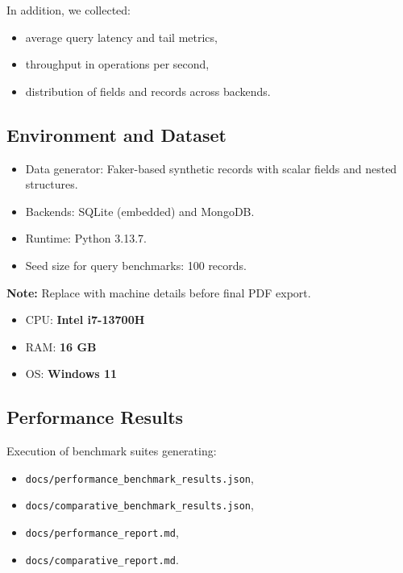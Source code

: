 \documentclass[12pt,a4paper]{article}
\begin{document}
In addition, we collected:
\begin{itemize}
	\item average query latency and tail metrics,
	\item throughput in operations per second,
	\item distribution of fields and records across backends.
\end{itemize}

\subsection{Environment and Dataset}
\begin{itemize}
	\item Data generator: Faker-based synthetic records with scalar fields and nested structures.
	\item Backends: SQLite (embedded) and MongoDB.
	\item Runtime: Python 3.13.7.
	\item Seed size for query benchmarks: 100 records.
\end{itemize}

\textbf{Note:} Replace with machine details before final PDF export.
\begin{itemize}
	\item CPU: \textbf{Intel i7-13700H}
	\item RAM: \textbf{16 GB}
	\item OS: \textbf{Windows 11}
\end{itemize}

\subsection{Performance Results}

Execution of benchmark suites generating:
\begin{itemize}
    \item \texttt{docs/performance\_benchmark\_results.json},
    \item \texttt{docs/comparative\_benchmark\_results.json},
    \item \texttt{docs/performance\_report.md},
    \item \texttt{docs/comparative\_report.md}.
\end{itemize}
\end{document}
